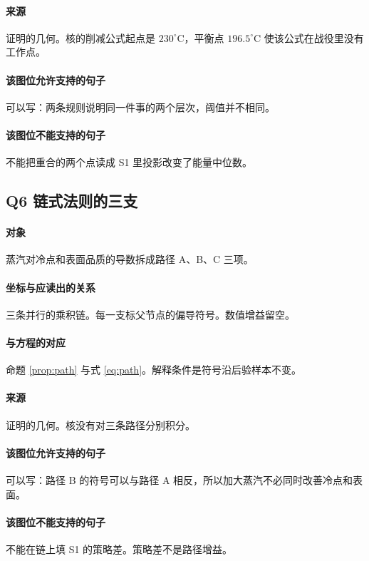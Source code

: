 \paragraph{来源}
证明的几何。核的削减公式起点是 $230^\circ\mathrm{C}$，平衡点 $196.5^\circ\mathrm{C}$ 使该公式在战役里没有工作点。

\paragraph{该图位允许支持的句子}
可以写：两条规则说明同一件事的两个层次，阈值并不相同。

\paragraph{该图位不能支持的句子}
不能把重合的两个点读成 S1 里投影改变了能量中位数。

\subsection{Q6 链式法则的三支}
\paragraph{对象}
蒸汽对冷点和表面品质的导数拆成路径 A、B、C 三项。

\paragraph{坐标与应读出的关系}
三条并行的乘积链。每一支标父节点的偏导符号。数值增益留空。

\paragraph{与方程的对应}
命题 \ref{prop:path} 与式 \eqref{eq:path}。解释条件是符号沿后验样本不变。

\paragraph{来源}
证明的几何。核没有对三条路径分别积分。

\paragraph{该图位允许支持的句子}
可以写：路径 B 的符号可以与路径 A 相反，所以加大蒸汽不必同时改善冷点和表面。

\paragraph{该图位不能支持的句子}
不能在链上填 S1 的策略差。策略差不是路径增益。

